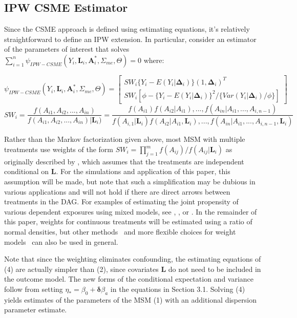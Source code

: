 \documentclass[useAMS,usenatbib,referee]{biom}
\begin{document}
\subsection{IPW CSME Estimator}

Since the CSME approach is defined using estimating equations, it's relatively straightforward to define an IPW extension. In particular, consider an estimator of the parameters of interest that solves $\sum_{i=1}^{n} \psi_{IPW-CSME}(Y_{i}, \bm{L}_{i}, \bm{A}^{*}_{i}, \Sigma_{me}, \Theta) = 0$ where:

\begin{equation}
    \psi_{IPW-CSME}(Y_{i}, \bm{L}_{i}, \bm{A}^{*}_{i}, \Sigma_{me}, \Theta) =
    \begin{bmatrix}
       SW_{i} \{ Y_{i} - E(Y_{i} | \bm{\Delta}_{i}) \} (1, \bm{\Delta}_{i})^{T} \\
       SW_{i} \left [ \phi - \{ Y_{i} - E(Y_{i} | \bm{\Delta}_{i})\}^{2} / \{ Var(Y_{i} | \bm{\Delta}_{i}) / \phi \} \right ]
    \end{bmatrix}
\end{equation}
\begin{equation*}
SW_{i} = \frac{f(A_{i1}, A_{i2}, ..., A_{in})}{f(A_{i1}, A_{i2}, ..., A_{in}) | \bm{L}_{i})} = \frac{f(A_{i1})f(A_{i2} | A_{i1}), ..., f(A_{in} | A_{i1}, ..., A_{i,n-1})}{f(A_{i,1} | \bm{L}_{i})f(A_{i2} | A_{i1}, \bm{L}_{i}), ..., f(A_{in} | A_{i1}, ..., A_{i,n-1}, \bm{L}_{i})}
\end{equation*}

Rather than the Markov factorization given above, most MSM with multiple treatments use weights of the form $SW_{i} = \prod_{j=1}^{m} f(A_{ij}) / f(A_{ij} | \bm{L}_{i})$ as originally described by \citet{hernan2001}, which assumes that the treatments are independent conditional on $\bm{L}$. For the simulations and application of this paper, this assumption will be made, but note that such a simplification may be dubious in various applications and will not hold if there are direct arrows between treatments in the DAG. For examples of estimating the joint propensity of various dependent exposures using mixed models, see \citet{tchetgen2012}, \citet{perez2014}, or \citet*{liu2016}. In the remainder of this paper, weights for continuous treatments will be estimated using a ratio of normal densities, but other methods~\citep{hirano2004} and more flexible choices for weight models~\citep{naimi2014} can also be used in general.

Note that since the weighting eliminates confounding, the estimating equations of (4) are actually simpler than (2), since covariates $\bm{L}$ do not need to be included in the outcome model. The new forms of the conditional expectation and variance follow from setting $\eta_{*} = \beta_{0} + \bm{\delta}\beta_{a}$ in the equations in Section 3.1. Solving (4) yields estimates of the parameters of the MSM (1) with an additional dispersion parameter estimate.
\end{document}
